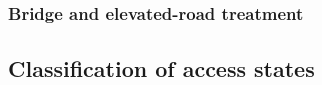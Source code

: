 \subsubsection{Bridge and elevated-road treatment}
\label{sec:bridges}
\label{sec:methods-bridges}


\subsection{Classification of access states}
\label{sec:methods-states}


